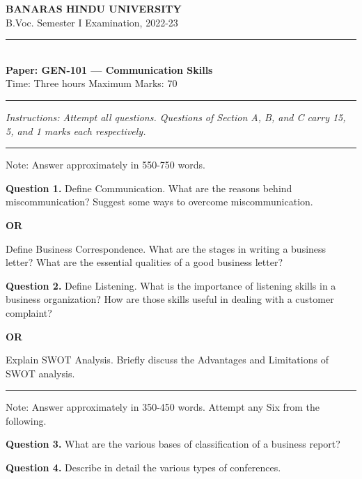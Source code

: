 \documentclass[11pt,a4paper]{article}
\begin{document}
\begin{center}
  {\large\bfseries BANARAS HINDU UNIVERSITY}\\[2pt]
  {\normalsize B.Voc. Semester I Examination, 2022-23}\\[6pt]
  \rule{0.8\linewidth}{0.5pt}\\[6pt]
  {\large\bfseries Paper: GEN-101 --- Communication Skills}\\[4pt]
  {\normalsize Time: Three hours \hfill Maximum Marks: 70}
\end{center}

\rule{\linewidth}{0.4pt}

\smallskip



\noindent   \textit{Instructions: Attempt all questions. Questions of Section A, B, and C carry 15, 5, and 1 marks each respectively.}

\bigskip

\bigskip


\rule{\linewidth}{0.4pt}\smallskip

Note: Answer approximately in 550-750 words.

\medskip


\noindent   \textbf{Question 1.} Define Communication. What are the reasons behind miscommunication? Suggest some ways to overcome miscommunication.
\centerline{   \textbf{OR}}
Define Business Correspondence. What are the stages in writing a business letter? What are the essential qualities of a good business letter?

\medskip


\noindent   \textbf{Question 2.} Define Listening. What is the importance of listening skills in a business organization? How are those skills useful in dealing with a customer complaint?
\centerline{   \textbf{OR}}
Explain SWOT Analysis. Briefly discuss the Advantages and Limitations of SWOT analysis.

\bigskip


\rule{\linewidth}{0.4pt}\smallskip

Note: Answer approximately in 350-450 words. Attempt any Six from the following.

\medskip


\noindent   \textbf{Question 3.} What are the various bases of classification of a business report?

\medskip


\noindent   \textbf{Question 4.} Describe in detail the various types of conferences.
\end{document}
